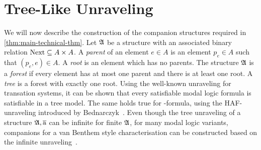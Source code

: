 
\section{Tree-Like Unraveling}\label{sec:unraveling}
We will now describe the construction of the companion structures required in \cref{thm:main-technical-thm}.
Let ${\mathfrak{A}}$ be a structure with an associated binary relation $\mathrm{Next} \subseteq A \times A$.
A \emph{parent} of an element $e \in A$ is an element $p_{e} \in A$ such that $(p_{e}, e) \in A$.
A \emph{root} is an element which has no parents.
The structure ${\mathfrak{A}}$ is a \emph{forest} if every element has at most one parent and there is at least one root.
A \emph{tree} is a forest with exactly one root.
Using the well-known unraveling for transation systems, it can be shown that every satisfiable modal logic formula is satisfiable in a tree model.
The same holds true for \FGF-formula, using the HAF-unraveling introduced by Bednarczyk~\cite[Sec 3.3]{Bednarczyk21}.
Even though the tree unraveling of a structure ${\mathfrak{A}}, \overline{\mathrm{a}}$ can be infinite for finite ${\mathfrak{A}}$,
for many modal logic variants, companions for a van Benthem style characterisation can be constructed based on the infinite unraveling~\cite{Otto04}.

